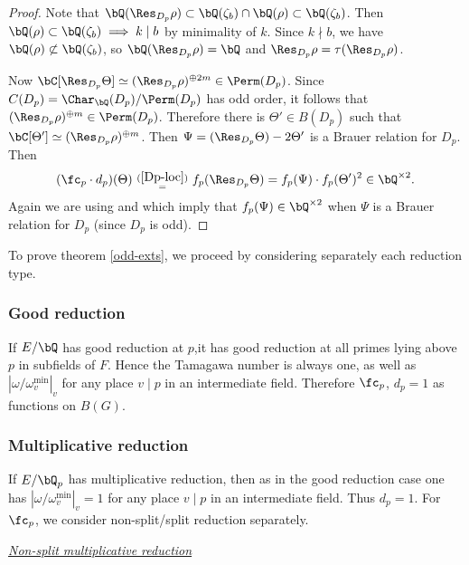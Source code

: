 \begin{proof}
    Note that $\bQ(\Res_{D_p}{\rho}) \subset \bQ(\zeta_b) \cap \bQ(\rho) \subset \bQ(\zeta_b)$. Then $\bQ(\rho) \subset \bQ(\zeta_b) \implies k \mid b$ by minimality of $k$. Since $k \nmid b$, we have $\bQ(\rho) \not\subset \bQ(\zeta_b)$, so $\bQ(\Res_{D_p} \rho) = \bQ$ and $\Res_{D_p} \rho = \tau (\Res_{D_p} \rho)$. 
    
    Now $\bC[\Res_{D_p} \Theta] \simeq (\Res_{D_p} \rho)^{\oplus 2 m} \in \Perm(D_p)$. Since $C(D_p) = \Char_{\bQ}(D_p) / \Perm(D_p)$ has odd order, it follows that $(\Res_{D_p} \rho)^{\oplus m} \in \Perm(D_p)$.  
    Therefore there is $\Theta' \in B(D_p)$ such that $\bC[\Theta'] \simeq (\Res_{D_p} \rho)^{\oplus m}$. Then $\Psi = (\Res_{D_p}\Theta) - 2 \Theta'$ is a Brauer relation for $D_p$. Then 
    \[(\fc_p \cdot d_p)(\Theta) \ {\ov{(\ref{Dp-loc})}{=}} \ f_p(\Res_{D_p}\Theta)
    = f_p(\Psi) \cdot f_p(\Theta')^2 \in \bQ^{\times 2}. \]
    Again we are using \cite[Theorem 2.47]{reg-const} and \cite[Theorem 3.2]{reg-const} which imply that $f_p(\Psi) \in \bQ^{\times 2}$ when $\Psi$ is a Brauer relation for $D_p$ (since $D_p$ is odd).   
\end{proof}


To prove theorem \ref{odd-exts}, we proceed by considering separately each reduction type.

\subsubsection*{Good reduction}
If $E / \bQ$ has good reduction at $p$,it has good reduction at all primes lying above $p$ in subfields of $F$. Hence the Tamagawa number is always one, as well as $\left|\omega / \omega_{v}^{\min}\right|_v$ for any place $v \mid p$ in an intermediate field. Therefore $\fc_p$, $d_p = 1$ as functions on $B(G)$.

\subsubsection*{Multiplicative reduction}

If $E / \bQ_p$ has multiplicative reduction, then as in the good reduction case one has $\left|\omega / \omega_{v}^{\min}\right|_v = 1$ for any place $v \mid p$ in an intermediate field. Thus $d_p = 1$.
For $\fc_p$, we consider non-split/split reduction separately.
\vspace{1em}

\noindent\underline{\textit{Non-split multiplicative reduction}}

